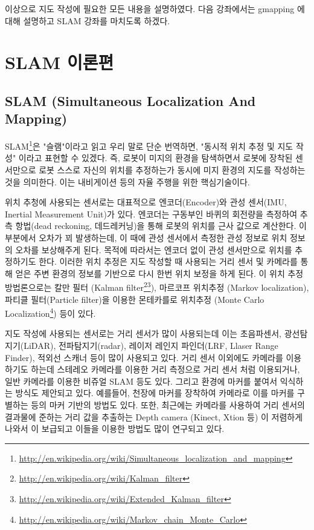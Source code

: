 이상으로 지도 작성에 필요한 모든 내용을 설명하였다. 다음 강좌에서는 gmapping 에 대해 설명하고 SLAM 강좌를 마치도록 하겠다.


\section{SLAM 이론편}

\subsection{SLAM (Simultaneous Localization And Mapping)}

SLAM\footnote{\url{http://en.wikipedia.org/wiki/Simultaneous_localization_and_mapping}}은 "슬램"이라고 읽고 우리 말로 단순 번역하면, "동시적 위치 추정 및 지도 작성" 이라고 표현할 수 있겠다. 즉, 로봇이 미지의 환경을 탐색하면서 로봇에 장착된 센서만으로 로봇 스스로 자신의 위치를 추정하는가 동시에 미지 환경의 지도를 작성하는 것을 의미한다. 이는 내비게이션 등의 자율 주행을 위한 핵심기술이다.

위치 추청에 사용되는 센서로는 대표적으로 엔코더(Encoder)와 관성 센서(IMU, Inertial Measurement Unit)가 있다. 엔코더는 구동부인 바퀴의 회전량을 측정하여 추측 항법(dead reckoning, 데드레커닝)을 통해 로봇의 위치를 근사 값으로 계산한다. 이 부분에서 오차가 꾀 발생하는데, 이 때에 관성 센서에서 측정한 관성 정보로 위치 정보의 오차를 보상해주게 된다. 목적에 따라서는 엔코더 없이 관성 센서만으로 위치를 추정하기도 한다. 이러한 위치 추정은 지도 작성할 때 사용되는 거리 센서 및 카메라를 통해 얻은 주변 환경의 정보를 기반으로 다시 한번 위치 보정을 하게 된다. 이 위치 추정 방법론으로는 칼만 필터 (Kalman filter\footnote{\url{http://en.wikipedia.org/wiki/Kalman_filter}}\footnote{\url{http://en.wikipedia.org/wiki/Extended_Kalman_filter}}), 마르코프 위치추정 (Markov localization), 파티클 필터(Particle filter)을 이용한 몬테카를로 위치추정 (Monte Carlo Localization\footnote{\url{http://en.wikipedia.org/wiki/Markov_chain_Monte_Carlo}}) 등이 있다.

지도 작성에 사용되는 센서로는 거리 센서가 많이 사용되는데 이는 초음파센서, 광선탐지기(LiDAR), 전파탐지기(radar), 레이저 레인지 파인더(LRF, Llaser Range Finder), 적외선 스캐너 등이 많이 사용되고 있다. 거리 센서 이외에도 카메라를 이용하기도 하는데 스테레오 카메라를 이용한 거리 측정으로 거리 센서 처럼 이용되거나, 일반 카메라를 이용한 비쥬얼 SLAM 등도 있다. 그리고 환경에 마커를 붙여서 익식하는 방식도 제안되고 있다. 예를들어, 천장에 마커를 장착하여 카메라로 이를 마커를 구별하는 등의 마커 기반의 방법도 있다. 또한, 최근에는 카메라를 사용하여 거리 센서의 결과물에 준하는 거리 값을 추출하는 Depth camera (Kinect, Xtion 등) 이 저렴하게 나와서 이 보급되고 이들을 이용한 방법도 많이 연구되고 있다.


